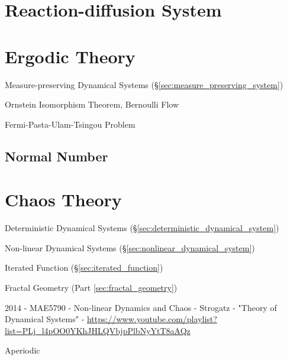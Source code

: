 \section{Reaction-diffusion System}\label{sec:reaction_diffusion}

\section{Ergodic Theory}\label{sec:ergodic_theory}

\fist Measure-preserving Dynamical Systems
(\S\ref{sec:measure_preserving_system})

Ornstein Isomorphism Theorem, Bernoulli Flow

Fermi-Pasta-Ulam-Tsingou Problem



\subsection{Normal Number}\label{sec:normal_number}



\section{Chaos Theory}\label{sec:chaos_theory}

Deterministic Dynamical Systems (\S\ref{sec:deterministic_dynamical_system})

Non-linear Dynamical Systems (\S\ref{sec:nonlinear_dynamical_system})

Iterated Function (\S\ref{sec:iterated_function})

Fractal Geometry (Part \ref{sec:fractal_geometry})

2014 - MAE5790 - Non-linear Dynamics and Chaos - Strogatz - "Theory of
Dynamical Systems" -
\url{https://www.youtube.com/playlist?list=PLj_l4pOO0YKhJHLQVbjpPlbNyYtT8aAQz}

Aperiodic

